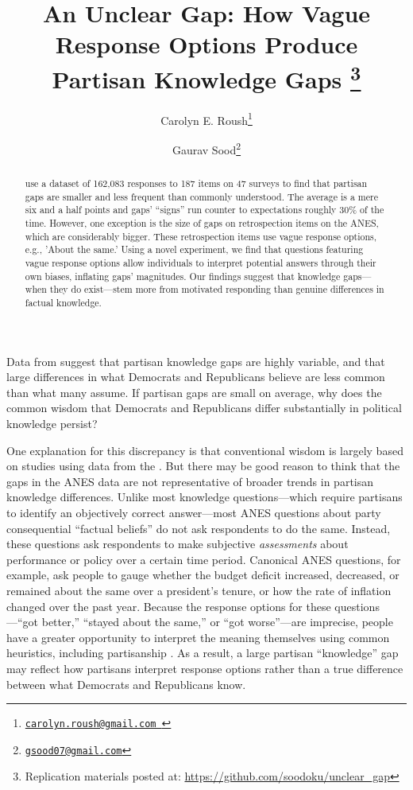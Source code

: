 \documentclass[12pt, letterpaper]{article}
\title{An Unclear Gap: How Vague Response Options Produce Partisan Knowledge Gaps \thanks{Replication materials posted at: \url{ https://github.com/soodoku/unclear_gap}}}
\author{Carolyn E. Roush\thanks{\href{mailto:carolyn.roush@gmail.com}{\texttt{carolyn.roush@gmail.com }}} \and Gaurav Sood\thanks{\href{mailto:gsood07@gmail.com}{\texttt{gsood07@gmail.com}}}}
\begin{document}
\maketitle
\thispagestyle{empty}

\begin{abstract}

\noindent \citet{roush_2021} use a dataset of 162,083 responses to 187 items on 47 surveys to find that partisan gaps are smaller and less frequent than commonly understood. The average is a mere six and a half points and gaps' ``signs'' run counter to expectations roughly 30\% of the time. However, one exception is the size of gaps on retrospection items on the ANES, which are considerably bigger. These retrospection items use vague response options, e.g., 'About the same.' Using a novel experiment, we find that questions featuring vague response options allow individuals to interpret potential answers through their own biases, inflating gaps' magnitudes. Our findings suggest that knowledge gaps---when they do exist---stem more from motivated responding than genuine differences in factual knowledge.
\end{abstract}

\vspace{.2in}

\newpage

\doublespacing
Data from \citet{roush_2021} suggest that partisan knowledge gaps are highly variable, and that large differences in what Democrats and Republicans believe are less common than what many assume. If partisan gaps are small on average, why does the common wisdom that Democrats and Republicans differ substantially in political knowledge persist? 

One explanation for this discrepancy is that conventional wisdom is largely based on studies using data from the \citet{anes_gen}. But there may be good reason to think that the gaps in the ANES data are not representative of broader trends in partisan knowledge differences. Unlike most knowledge questions---which require partisans to identify an objectively correct answer---most ANES questions about party consequential ``factual beliefs'' do not ask respondents to do the same. Instead, these questions ask respondents to make subjective \textit{assessments} about performance or policy over a certain time period. Canonical ANES questions, for example, ask people to gauge whether the budget deficit increased, decreased, or remained about the same over a president's tenure, or how the rate of inflation changed over the past year. Because the response options for these questions---``got better,'' ``stayed about the same,'' or ``got worse''---are imprecise, people have a greater opportunity to interpret the meaning themselves \citep[e.g.][]{beyth_1982} using common heuristics, including partisanship \citep[e.g.][]{soodguess_2017}. As a result, a large partisan ``knowledge'' gap may reflect how partisans interpret response options rather than a true difference between what Democrats and Republicans know.
\end{document}
